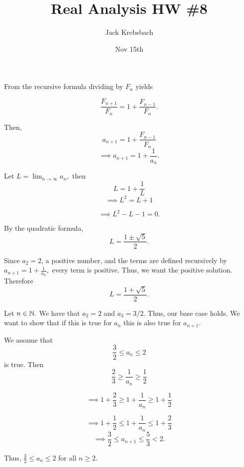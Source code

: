 \documentclass{report}
\title{Real Analysis HW \#8}
\author{Jack Krebsbach }
\date{Nov 15th}
\begin{document}
\maketitle



\sol
From the recursive formula dividing by $F_n$ yields

$$\frac{F_{n+1}}{F_n} = 1 + \frac{F_{n-1}}{F_n}.$$

Then, $$a_{n+1} = 1 + \frac{F_{n-1}}{F_n}$$
$$ \implies a_{n+1} = 1 + \frac{1}{a_n}.$$

Let $L = \lim_{n \rightarrow \infty} a_n,$ then  $$ L = 1 + \frac{1}{L}$$
$$ \implies L^2 = L + 1$$


$$\implies L^2 - L -1=0.$$

By the quadratic formula,  $$L = \frac{ 1 \pm \sqrt{5}}{2}.$$ 

Since $a_2=2$, a positive number, and the terms are defined recursively by $a_{n+1} = 1 + \frac{1}{a_n},$ every term is positive. Thus, we want the positive solution. Therefore $$L  = \frac{ 1 + \sqrt{5}}{2}.$$



\pagebreak


\begin{myproof}
    
  Let $n\in \NN.$  We have that  $a_2 = 2$ and $a_3 = 3/2.$ Thus, our base case holds. We want to show that if this is true for $a_n$ this is also true for $a_{n+1}.$

We assume that $$ \frac{3}{2} \leq a_n \leq 2$$ is true.  Then
$$ \frac{2}{3} \geq \frac{1}{a_n} \geq \frac{1}{2}$$

$$\implies  1+ \frac{2}{3} \geq 1+ \frac{1}{a_n} \geq 1+\frac{1}{2}$$

$$\implies  1+ \frac{1}{2} \leq 1+ \frac{1}{a_n} \leq 1+\frac{2}{3}$$
$$\implies  \frac{3}{2} \leq a_{n+1} \leq \frac{5}{3} < 2.$$

Thus, $\frac{3}{2} \leq a_n \leq 2$ for all  $n \geq 2.$ 
\end{myproof}
\end{document}
